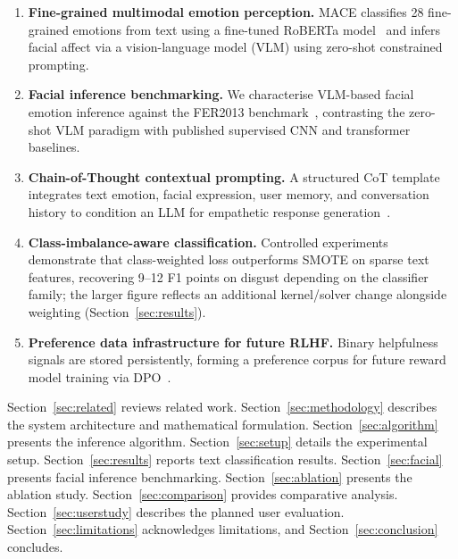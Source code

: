 \documentclass[conference]{IEEEtran}
\begin{document}
\begin{enumerate}
    \item \textbf{Fine-grained multimodal emotion perception.}
          MACE classifies 28 fine-grained emotions from text
          using a fine-tuned RoBERTa model~\cite{samlow2022goemotions}
          and infers facial affect via a vision-language model
          (VLM) using zero-shot constrained prompting.
    \item \textbf{Facial inference benchmarking.}
          We characterise VLM-based facial emotion inference
          against the FER2013 benchmark~\cite{goodfellow2013fer},
          contrasting the zero-shot VLM paradigm with published
          supervised CNN and transformer baselines.
    \item \textbf{Chain-of-Thought contextual prompting.}
          A structured CoT template integrates text emotion,
          facial expression, user memory, and conversation history
          to condition an LLM for empathetic response
          generation~\cite{wei2022chainofthought}.
    \item \textbf{Class-imbalance-aware classification.}
          Controlled experiments demonstrate that class-weighted
          loss outperforms SMOTE on sparse text features,
          recovering 9--12 F1 points on disgust depending on the
          classifier family; the larger figure reflects an
          additional kernel/solver change alongside weighting
          (Section~\ref{sec:results}).
    \item \textbf{Preference data infrastructure for future RLHF.}
          Binary helpfulness signals are stored persistently,
          forming a preference corpus for future reward model
          training via DPO~\cite{ouyang2022rlhf,rafailov2023dpo}.
\end{enumerate}

Section~\ref{sec:related} reviews related work.
Section~\ref{sec:methodology} describes the system architecture
and mathematical formulation.
Section~\ref{sec:algorithm} presents the inference algorithm.
Section~\ref{sec:setup} details the experimental setup.
Section~\ref{sec:results} reports text classification results.
Section~\ref{sec:facial} presents facial inference benchmarking.
Section~\ref{sec:ablation} presents the ablation study.
Section~\ref{sec:comparison} provides comparative analysis.
Section~\ref{sec:userstudy} describes the planned user evaluation.
Section~\ref{sec:limitations} acknowledges limitations, and
Section~\ref{sec:conclusion} concludes.
\end{document}

